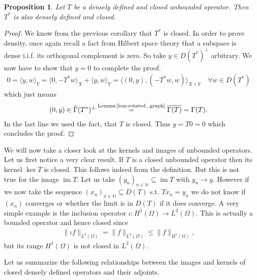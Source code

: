 \documentclass[12pt,a4paper]{article}
\numberwithin{equation}{subsection}
\numberwithin{lemma}{subsection}
\newtheorem{proposition}[lemma]{Proposition}
\theoremstyle{definition}
\DeclareMathOperator{\Ima}{im}
\newcommand{\naturalnum}{\mathbb{N}}
\begin{document}
\begin{proposition}\label{prop:adjoint_of_densely_defined_closed}
    Let $T$ be a densely defined and closed unbounded operator.
    Then $T^*$ is also densely defined and closed.
\end{proposition}
\begin{proof}
    We know from the previous corollary that $T^*$ is closed. 
    In order to prove density, once again recall a fact from Hilbert space
    theory that a subspace is dense i.i.f. its orthogonal complement 
    is zero. So take $y \in D(T^*)^\perp$ arbitrary. We now have to show that 
    $y=0$ to complete the proof.
    \begin{align*}
        0 = \langle y, w \rangle_Y 
        = \langle 0, -T^*w \rangle _X + \langle y, w \rangle _Y
        = \langle (0,y), (-T^*w,w) \rangle _{X\times Y} \quad \forall w \in D(T^*)
    \end{align*}
    which just means
    \begin{align*}
        (0,y) \in \tilde{\Gamma}(T^*)^\perp 
        \stackrel{\text{Lemma\,\ref{lem:rotated_graph}} }{=} \overline{\Gamma(T)}
        = \Gamma(T).
    \end{align*}
    In the last line we used the fact, that $T$ is closed. 
    Thus $y = T0 = 0$ which concludes the proof.
\end{proof}

We will now take a closer look at the kernels and images of unbounded operators.
Let us first notice a very clear result. If $T$ is a closed unbounded operator 
then its kernel $\ker T$ is closed. This follows indeed from the definition. 
But this is not true for the image $\Ima T$. Let us take
$(y_n)_{n \in \naturalnum} \subseteq \Ima T$ with $y_n \rightarrow y$.
However if we now take the sequence $(x_n)_{n \in \naturalnum} \subseteq D(T)$
s.t. $Tx_n = y_n$ we do not know if $(x_n)$ converges or 
whether the limit is in $D(T)$ if it does converge. 
A very simple example is the inclusion operator
$\iota: H^1(\Omega) \rightarrow L^2(\Omega)$. This is actually a bounded 
operator and hence closed since 
\begin{align*}
    \lVert \iota f \rVert _{L^2(\Omega)} 
    = \lVert f \rVert _{L^2(\Omega)} 
    \leq \lVert f \rVert _{H^1(\Omega)},
\end{align*}
but its range $H^1(\Omega)$ is not closed in $L^2(\Omega)$.

Let us summarize the following relationships between the images and kernels 
of closed densely defined operators and their adjoints.
\end{document}
